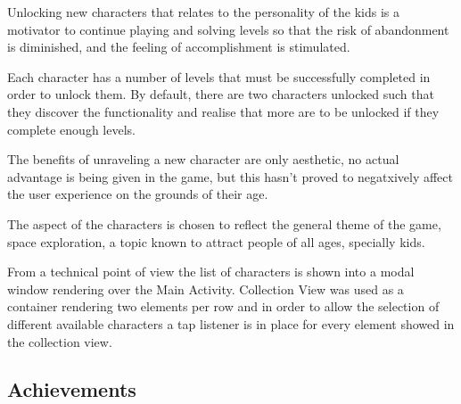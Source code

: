 \documentclass[12 pct]{report}
\begin{document}
Unlocking new characters that relates to the personality of the kids is a motivator to continue playing and solving levels so that the risk of abandonment is diminished, and the feeling of accomplishment is stimulated.

Each character has a number of levels that must be successfully completed in order to unlock them.  By default, there are two characters unlocked such that they discover the functionality and realise that more are to be unlocked if they complete enough levels.

The benefits of unraveling a new character are only aesthetic, no actual advantage is being given in the game, but this hasn't proved to negatxively affect the user experience on the grounds of their age.

The aspect of the characters is chosen to reflect the general theme of the game, space exploration, a topic known to attract people of all ages, specially kids.

From a technical point of view the list of characters is shown into a modal window rendering over the Main Activity. Collection View was used as a container rendering two elements per row and in order to allow the selection of different available characters a tap listener is in place for every element showed in the collection view.

\subsection*{Achievements}
 
\end{document}
